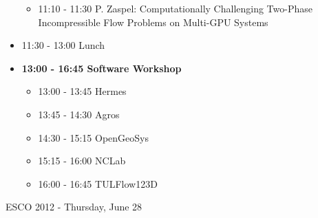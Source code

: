 \documentclass[10pt, A4]{article}%
\begin{document}
\begin{itemize}
\begin{itemize}
    \item 11:10 - 11:30 P. Zaspel: Computationally Challenging Two-Phase Incompressible Flow Problems on Multi-GPU Systems
  \end{itemize}
  \item 11:30 - 13:00 Lunch
  \item {\bf 13:00 - 16:45 Software Workshop}
  \begin{itemize}
    \item 13:00 - 13:45 Hermes 
    \item 13:45 - 14:30 Agros
    \item 14:30 - 15:15 OpenGeoSys
    \item 15:15 - 16:00 NCLab
    \item 16:00 - 16:45 TULFlow123D 
  \end{itemize}
\end{itemize}

\newpage

\centerline{\huge ESCO 2012 - Thursday, June 28}
\vspace{4mm}
\end{document}
